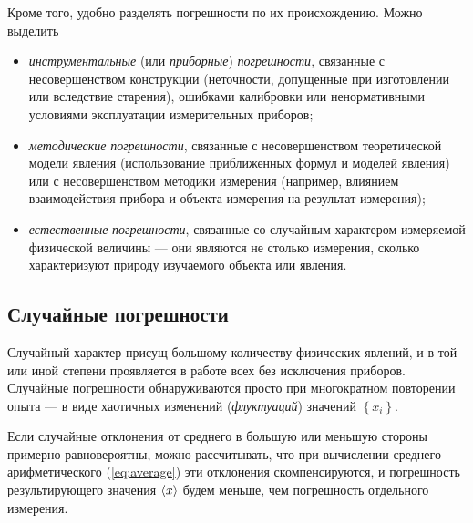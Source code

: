 Кроме того, удобно разделять погрешности по их происхождению. Можно
выделить
\begin{itemize}\small
    \item \emph{инструментальные} (или \emph{приборные}) \emph{погрешности},
связанные с несовершенством конструкции (неточности, допущенные при
изготовлении или вследствие старения), ошибками калибровки или ненормативными
условиями эксплуатации измерительных приборов;
    \item \emph{методические} \emph{погрешности}, связанные с несовершенством
теоретической модели явления (использование приближенных формул и
моделей явления) или с несовершенством методики измерения (например,
влиянием взаимодействия прибора и объекта измерения на результат измерения);
    \item \emph{естественные} \emph{погрешности}, связанные со случайным
характером
измеряемой физической величины --- они являются не столько
 измерения, сколько характеризуют
природу изучаемого объекта или явления.
\end{itemize}


\subsection{Случайные погрешности}

Случайный характер присущ большому количеству физических
явлений, и в той или иной степени проявляется в работе всех без исключения
приборов. Случайные погрешности обнаруживаются просто при многократном
повторении опыта --- в виде хаотичных изменений (\emph{флуктуаций})
значений $\left\{ x_{i}\right\} $.

Если случайные отклонения от среднего в большую или меньшую стороны
примерно равновероятны, можно рассчитывать, что при вычислении среднего
арифметического (\ref{eq:average}) эти отклонения скомпенсируются,
и погрешность результирующего значения $\left<x\right>$ будем меньше,
чем погрешность отдельного измерения.

